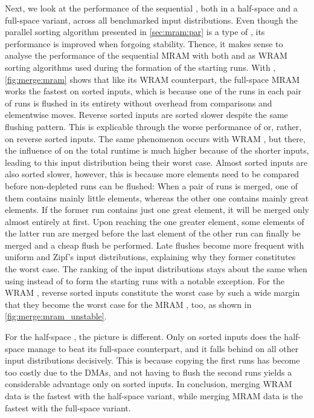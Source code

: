 Next, we look at the performance of the sequential \MS{}, both in a half-space and a full-space variant, across all benchmarked input distributions.
Even though the parallel sorting algorithm presented in \cref{sec:mram:par} is a type of \MS{}, its performance is improved when forgoing stability.
Thence, it makes sense to analyse the performance of the sequential \ac{MRAM} \MS{} with both \QS{} and \MS{} as \ac{WRAM} sorting algorithms used during the formation of the starting runs.
With \QS{}, \cref{fig:merge:mram} shows that like its \ac{WRAM} counterpart, the full-space \ac{MRAM} \MS{} works the fastest on sorted inputs, which is because one of the runs in each pair of runs is flushed in its entirety without overhead from comparisons and elementwise moves.
Reverse sorted inputs are sorted slower despite the same flushing pattern.
This is explicable through the worse performance of \QS{} \Dash or, rather, \IS{} \Dash on reverse sorted inputs.
The same phenomenon occurs with \ac{WRAM} \MS*{}, but there, the influence of \IS{} on the total runtime is much higher because of the shorter inputs, leading to this input distribution being their worst case.
Almost sorted inputs are also sorted slower, however, this is because more elements need to be compared before non-depleted runs can be flushed:
When a pair of runs is merged, one of them contains mainly little elements, whereas the other one contains mainly great elements.
If the former run contains just one great element, it will be merged only almost entirely at first.
Upon reaching the one greater element, some elements of the latter run are merged before the last element of the other run can finally be merged and a cheap flush be performed.
Late flushes become more frequent with uniform and Zipf's input distributions, explaining why they former constitutes the worst case.
The ranking of the input distributions stays about the same when using \MS{} instead of \QS{} to form the starting runs with a notable exception.
For the \ac{WRAM} \MS{}, reverse sorted inputs constitute the worst case by such a wide margin that they become the worst case for the \ac{MRAM} \MS{}, too, as shown in \cref{fig:merge:mram_unstable}.

For the half-space \MS{}, the picture is different.
Only on sorted inputs does the half-space \MS{} manage to beat its full-space counterpart, and it falls behind on all other input distributions decisively.
This is because copying the first runs has become too costly due to the \acp{DMA}, and not having to flush the second runs yields a considerable advantage only on sorted inputs.
In conclusion, merging \ac{WRAM} data is the fastest with the half-space variant, while merging \ac{MRAM} data is the fastest with the full-space variant.
